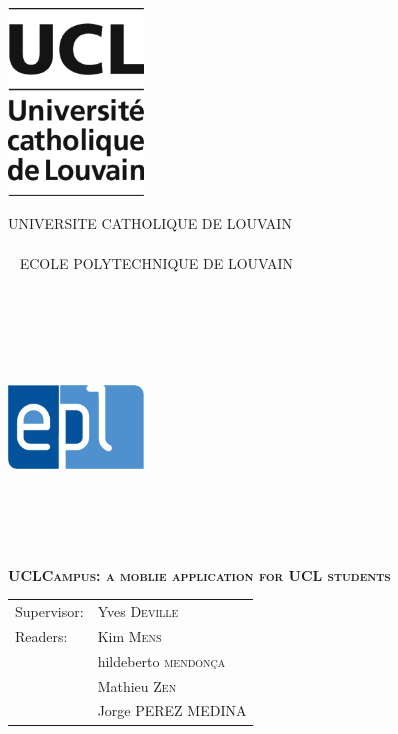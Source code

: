 \documentclass[11pt, a4paper]{report}
\renewcommand\title{UCLCampus: a moblie application for UCL students}
\newcommand\supervisor{Yves \textsc{Deville}}
\newcommand\readerone{Kim \textsc{Mens}}
\newcommand\readertwo{hildeberto \textsc{mendonça}}
\newcommand\readerthree{Mathieu \textsc{Zen}}
\newcommand\readerfour{Jorge \textsc{PEREZ MEDINA}}
\begin{document}
\thispagestyle{empty}
\noindent\begin{minipage}{.25\textwidth}
\noindent\includegraphics[width=3.6cm]{Images/ucl.jpg}
\end{minipage}
\begin{minipage}{.5\textwidth}
\begin{center}
UNIVERSITE CATHOLIQUE DE LOUVAIN
\\~\\~
ECOLE POLYTECHNIQUE DE LOUVAIN
\\~\\~\\~\\~\\~
\end{center}
\end{minipage}
\begin{minipage}{.25\textwidth}
\hfill\includegraphics[width=3.6cm]{Images/epl.jpg}
\\~\\~\\~\\~
\end{minipage}
\vspace{4.5cm}
\begin{center}
\bfseries{\scshape{\Huge{\title}}}
\end{center}
\vspace{4.5cm}
\begin{minipage}{.5\textwidth}
\begin{tabular}{ll}
Supervisor: & \supervisor
\\ Readers: & \readerone 
\\          & \readertwo 
\\          & \readerthree
\\          & \readerfour
\end{tabular} 
\\~\\~
\end{minipage}
\end{document}
